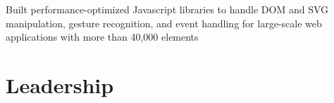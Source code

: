 \documentclass[letterpaper]{deedy-resume} %
\begin{document}
\begin{minipage}[t]{0.66\textwidth}



\begin{tightitemize}
  \item Built performance-optimized Javascript libraries to handle DOM and SVG manipulation, gesture recognition, and event handling for large-scale web applications with more than 40,000 elements
\end{tightitemize}

\sectionspace %








\section{Leadership}




\end{minipage}
\end{document}
